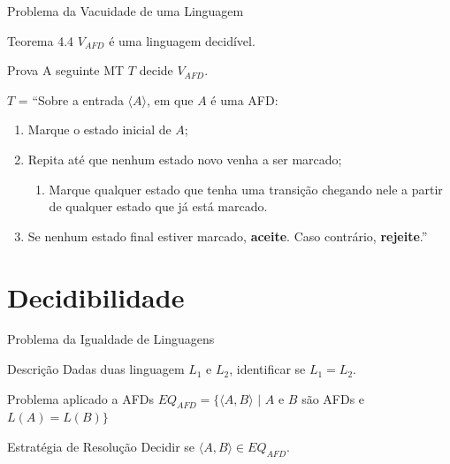\documentclass[xcolor=dvipsnames,table]{beamer}
\begin{document}
	\begin{frame}{Problema da Vacuidade de uma Linguagem}
		\begin{block}{Teorema 4.4}
			$V_{AFD}$ é uma linguagem decidível.
		\end{block}  
		\begin{block}{Prova}
			A seguinte MT $T$ decide $V_{AFD}$.
			
			$T$ = ``Sobre a entrada $\langle A \rangle$, em que $A$ é uma AFD:
			\begin{enumerate}
				\item Marque o estado inicial de $A$;
				\item Repita até que nenhum estado novo venha a ser marcado;
				\begin{enumerate}
					\item Marque qualquer estado que tenha uma transição chegando nele a partir de qualquer estado que já está marcado.
				\end{enumerate}
				\item Se nenhum estado final estiver marcado, {\bf aceite}. Caso contrário, {\bf rejeite}.''
			\end{enumerate}
		\end{block}
	\end{frame}
	
	\section{Decidibilidade}
	
	\begin{frame}{Problema da Igualdade de Linguagens}
		\begin{block}{Descrição}
			Dadas duas linguagem $L_1$ e $L_2$, identificar se $L_1 = L_2$.
		\end{block}	\pause
		\begin{block}{Problema aplicado a AFDs}
			$EQ_{AFD} = \{ \langle A, B \rangle \mbox{ | } A$ e $B$ são AFDs e $L(A) = L(B) \}$
		\end{block} \pause
		\begin{block}{Estratégia de Resolução}
			Decidir se $\langle A, B \rangle \in EQ_{AFD}$.
		\end{block}
	\end{frame}		
	
\end{document}
